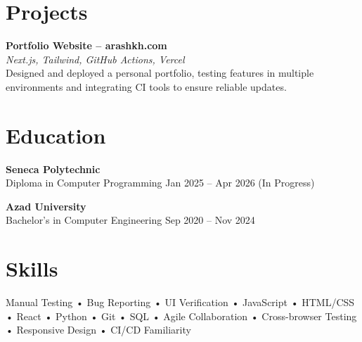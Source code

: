 \documentclass[letterpaper,11pt]{article}
\begin{document}
\vspace{0.6em}

\section*{Projects}
\textbf{Portfolio Website – arashkh.com}\\
\textit{Next.js, Tailwind, GitHub Actions, Vercel}\\
Designed and deployed a personal portfolio, testing features in multiple environments and integrating CI tools to ensure reliable updates.

\vspace{0.6em}

\section*{Education}
\textbf{Seneca Polytechnic}\\
Diploma in Computer Programming \hfill Jan 2025 -- Apr 2026 (In Progress)

\textbf{Azad University}\\
Bachelor's in Computer Engineering \hfill Sep 2020 -- Nov 2024

\vspace{0.6em}

\section*{Skills}
Manual Testing • Bug Reporting • UI Verification • JavaScript • HTML/CSS • React • Python • Git • SQL • Agile Collaboration • Cross-browser Testing • Responsive Design • CI/CD Familiarity
\end{document}
